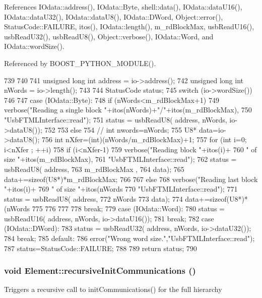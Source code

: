 References IOdata::address(), IOdata::Byte, shell::data(), IOdata::dataU16(), IOdata::dataU32(), IOdata::dataU8(), IOdata::DWord, Object::error(), StatusCode::FAILURE, itos(), IOdata::length(), m\_\-rdBlockMax, usbReadU16(), usbReadU32(), usbReadU8(), Object::verbose(), IOdata::Word, and IOdata::wordSize().

Referenced by BOOST\_\-PYTHON\_\-MODULE().


\begin{DoxyCode}
739                                            {
740 
741   unsigned long int address = io->address();
742   unsigned long int nWords = io->length();
743 
744   StatusCode status;
745   switch (io->wordSize())
746   {
747   case (IOdata::Byte):
748     if (nWords<m_rdBlockMax+1){
749       verbose("Reading a single block "+itos(nWords)+"/"+itos(m_rdBlockMax),
750               "UsbFTMLInterface::read");
751       status = usbReadU8( address, nWords, io->dataU8());        
752     }
753     else {
754       //      int nwords=nWords;
755       U8* data=io->dataU8();
756       int nXfer=(int)(nWords/m_rdBlockMax)+1;
757       for (int i=0; i<nXfer ; ++i){
758         if (i<nXfer-1){
759           verbose("Reading block "+itos(i)+
760                   " of size "+itos(m_rdBlockMax),
761                   "UsbFTMLInterface::read");
762           status = usbReadU8( address, 
763                               m_rdBlockMax , 
764                               data);
765           data+=sizeof(U8*)*m_rdBlockMax;
766         }
767         else {
768           verbose("Reading last block "+itos(i)+
769                   " of size "+itos(nWords%
770                   "UsbFTMLInterface::read");
771           status = usbReadU8( address, 
772                               nWords%
773                               data); 
774           data+=sizeof(U8*)*(nWords%
775         }
776       }
777     }
778     break;
779   case (IOdata::Word):
780     status = usbReadU16( address, nWords, io->dataU16());
781     break;
782   case (IOdata::DWord):
783     status = usbReadU32( address, nWords, io->dataU32());
784     break;
785   default:
786     error("Wrong word size.","UsbFTMLInterface::read");
787     status=StatusCode::FAILURE;
788   }
789   return status;
790 }
\end{DoxyCode}
\hypertarget{classElement_a82119ed37dff76508a2746a853ec35ba}{
\subsubsection[{recursiveInitCommunications}]{\setlength{\rightskip}{0pt plus 5cm}void Element::recursiveInitCommunications ()}}
\label{classElement_a82119ed37dff76508a2746a853ec35ba}
Triggers a recursive call to initCommunications() for the full hierarchy

